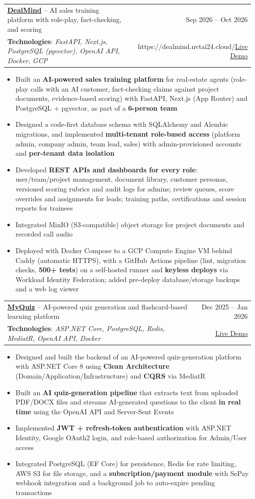 \documentclass[letterpaper,11pt]{article}
\makeatletter
\newcommand{\resumeItem}[1]{
  \item\small{
    \justifying
    #1 \vspace{-2pt}
  }
}
\newcommand{\resumeProjectHeading}[4][]{
  \item
    \begin{tabular*}{0.97\textwidth}{l@{\extracolsep{\fill}}r}
      \small #2 & #4 \\
      \small\textbf{Technologies}: \emph{#3} &
      \ifx\relax#1\relax\else\small\href{#1}{\underline{Live Demo}}\fi \\
    \end{tabular*}\vspace{-7pt}
}
\newcommand{\resumeItemListStart}{
  \begin{itemize}[leftmargin=0.2in]
  \justifying
}
\newcommand{\resumeItemListEnd}{\end{itemize}\vspace{-5pt}}
\makeatother
\begin{document}
    \resumeProjectHeading[https://dealmind.nvtai24.cloud/]
      {\href{https://github.com/nvtai24/dealmind}{\textbf{\underline{DealMind}}} -- AI sales training platform with role-play, fact-checking, and scoring}
      {FastAPI, Next.js, PostgreSQL (pgvector), OpenAI API, Docker, GCP}
      {Sep 2026 -- Oct 2026}
      \resumeItemListStart
        \resumeItem{Built an \textbf{AI-powered sales training platform} for real-estate agents (role-play calls with an AI
        customer, fact-checking claims against project documents, evidence-based scoring) with FastAPI, Next.js
        (App Router) and PostgreSQL + pgvector, as part of a \textbf{6-person team}}
        \resumeItem{Designed a code-first database schema with SQLAlchemy and Alembic migrations, and implemented
        \textbf{multi-tenant role-based access} (platform admin, company admin, team lead, sales) with admin-provisioned
        accounts and \textbf{per-tenant data isolation}}
        \resumeItem{Developed \textbf{REST APIs and dashboards for every role}: user/team/project management, document
        library, customer personas, versioned scoring rubrics and audit logs for admins; review queues, score
        overrides and assignments for leads; training paths, certifications and session reports for trainees}
        \resumeItem{Integrated MinIO (S3-compatible) object storage for project documents and recorded call audio}
        \resumeItem{Deployed with Docker Compose to a GCP Compute Engine VM behind Caddy (automatic HTTPS), with a
        GitHub Actions pipeline (lint, migration checks, \textbf{500+ tests}) on a self-hosted runner and
        \textbf{keyless deploys} via Workload Identity Federation; added pre-deploy database/storage backups and a web log viewer}
      \resumeItemListEnd

    \resumeProjectHeading
      {\href{https://github.com/nvtai24/myquiz-be}{\textbf{\underline{MyQuiz}}} -- AI-powered quiz generation and flashcard-based learning platform}
      {ASP.NET Core, PostgreSQL, Redis, MediatR, OpenAI API, Docker}
      {Dec 2025 -- Jan 2026}
      \resumeItemListStart
        \resumeItem{Designed and built the backend of an AI-powered quiz-generation platform with ASP.NET Core 8
        using \textbf{Clean Architecture} (Domain/Application/Infrastructure) and \textbf{CQRS} via MediatR}
        \resumeItem{Built an \textbf{AI quiz-generation pipeline} that extracts text from uploaded PDF/DOCX files and streams
        AI-generated questions to the client \textbf{in real time} using the OpenAI API and Server-Sent Events}
        \resumeItem{Implemented \textbf{JWT + refresh-token authentication} with ASP.NET Identity, Google OAuth2 login, and
        role-based authorization for Admin/User access}
        \resumeItem{Integrated PostgreSQL (EF Core) for persistence, Redis for rate limiting, AWS S3 for file
        storage, and a \textbf{subscription/payment module} with SePay webhook integration and a background job to
        auto-expire pending transactions}
      \resumeItemListEnd
\end{document}
